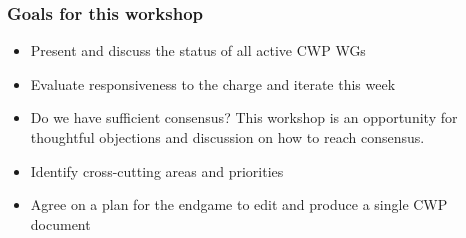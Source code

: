 \begin{frame}
\frametitle{Goals for this workshop}
\begin{itemize}
\item Present and discuss the status of all active CWP WGs
\item Evaluate responsiveness to the charge and iterate this week
\item Do we have sufficient consensus? This workshop is an opportunity for thoughtful objections and discussion on how to reach consensus.
\item Identify cross-cutting areas and priorities
\item Agree on a plan for the endgame to edit and produce a single CWP document
\end{itemize}

\end{frame}


